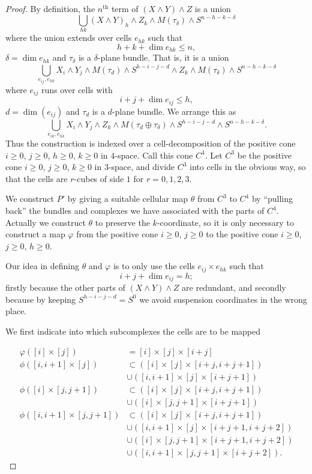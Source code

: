 \documentclass[../main]{subfiles}
\begin{document}
\begin{proof}
By definition, the $n^{\mathrm{th}}$ term of $(X \wedge Y) \wedge Z$ is a union \[\bigcup_{hk} (X \wedge Y)_h \wedge Z_k \wedge M(\tau_\delta) \wedge S^{n - h - k - \delta}\] where the union extends over cells $e_{hk}$ such that \[h + k + \dim e_{hk} \le n,\] $\delta = \dim e_{hk}$ and $\tau_\delta$ is a $\delta$-plane bundle. That is, it is a union \[\bigcup_{e_{ij}, e_{hk}} X_i \wedge Y_j \wedge M(\tau_d) \wedge S^{h - i - j - d} \wedge Z_k \wedge M(\tau_\delta) \wedge S^{n - h - k - \delta}\] where $e_{ij}$ runs over cells with \[i + j + \dim e_{ij} \le h,\] $d = \dim(e_{ij})$ and $\tau_d$ is a $d$-plane bundle. We arrange this as \[\bigcup_{e_{ik}, e_{hk}} X_i \wedge Y_j \wedge Z_k \wedge M(\tau_d \oplus \tau_\delta) \wedge S^{h - i - j - d} \wedge S^{n - h - k - \delta}.\] Thus the construction is indexed over a cell-decomposition of the positive cone $i \ge 0$, $j \ge 0$, $h \ge 0$, $k \ge 0$ in $4$-space. Call this cone $C^4$. Let $C^3$ be the positive cone $i \ge 0$, $j \ge 0$, $k \ge 0$ in $3$-space, and divide $C^3$ into cells in the obvious way, so that the cells are $r$-cubes of side $1$ for $r = 0, 1, 2, 3$. 

We construct $P'$ by giving a suitable cellular map $\theta$ from $C^3$ to $C^4$ by ``pulling back'' the bundles and complexes we have associated with the parts of $C^4$. Actually we construct $\theta$ to preserve the $k$-coordinate, so it is only necessary to construct a map $\varphi$ from the positive cone $i \ge 0$, $j \ge 0$ to the positive cone $i \ge 0$, $j \ge 0$, $h \ge 0$.

Our idea in defining $\theta$ and $\varphi$ is to only use the cells $e_{ij} \times e_{hk}$ such that \[i + j + \dim e_{ij} = h;\] firstly because the other parts of $(X \wedge Y) \wedge Z$ are redundant, and secondly because by keeping $S^{h - i - j - d} = S^0$ we avoid suspension coordinates in the wrong place.

 We first indicate into which subcomplexes the cells are to be mapped 

\begin{align*}
\varphi([i] \times [j]) & = [i] \times [j] \times [i + j] \\ \phi([i, i + 1] \times [j]) & \subset ([i] \times [j] \times [i + j, i + j + 1]) \\ & \cup ([i, i + 1] \times [j] \times [i + j + 1]) \\ \phi([i] \times [j, j + 1]) & \subset ([i] \times [j] \times [i + j, i + j + 1]) \\ & \cup ([i] \times [j, j + 1] \times [i + j + 1]) \\ \phi([i, i + 1] \times [j, j + 1]) & \subset ([i] \times [j] \times [i + j, i + j + 1]) \\ & \cup ([i, i + 1] \times [j] \times [i + j + 1, i + j + 2]) \\ & \cup ([i] \times [j, j + 1] \times [i +j + 1, i + j + 2]) \\ & \cup ([i, i + 1] \times [j, j + 1] \times [i + j + 2]).
\end{align*}


\end{proof}
\end{document}
